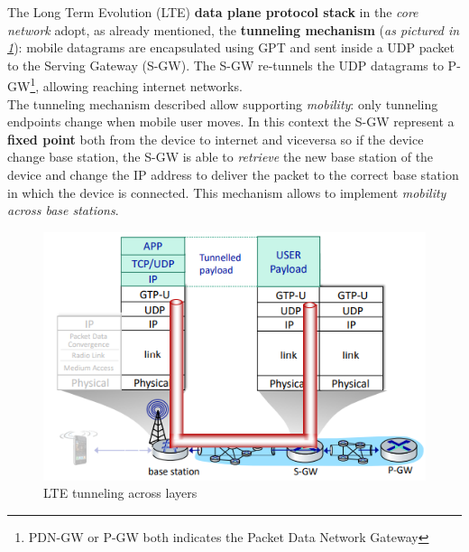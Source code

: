 \documentclass[10pt,a4paper]{report}
\theoremstyle{definition}
\begin{document}
The Long Term Evolution (LTE) \textbf{data plane protocol stack} in the \textit{core network} adopt, as already mentioned, the \textbf{tunneling mechanism} (\textit{as pictured in \ref{tunneling-5g}}): mobile datagrams are encapsulated using GPT and sent inside a UDP packet to the Serving Gateway (S-GW). The S-GW re-tunnels the UDP datagrams to P-GW\footnote{PDN-GW or P-GW both indicates the Packet Data Network Gateway}, allowing reaching internet networks.\\
The tunneling mechanism described allow supporting \textit{mobility}: only tunneling endpoints change when mobile user moves.
In this context the S-GW represent a \textbf{fixed point} both from the device to internet and viceversa so if the device change base station, the S-GW is able to \textit{retrieve} the new base station of the device and change the IP address to deliver the packet to the correct base station in which the device is connected. This mechanism allows to implement \textit{mobility across base stations}.

\begin{figure}[h]
	\centering
	\includegraphics[scale=0.50]{images/Pasted image 20230308165559.png}
	\caption{LTE tunneling across layers}
	\label{tunneling-5g}
\end{figure}
\end{document}
